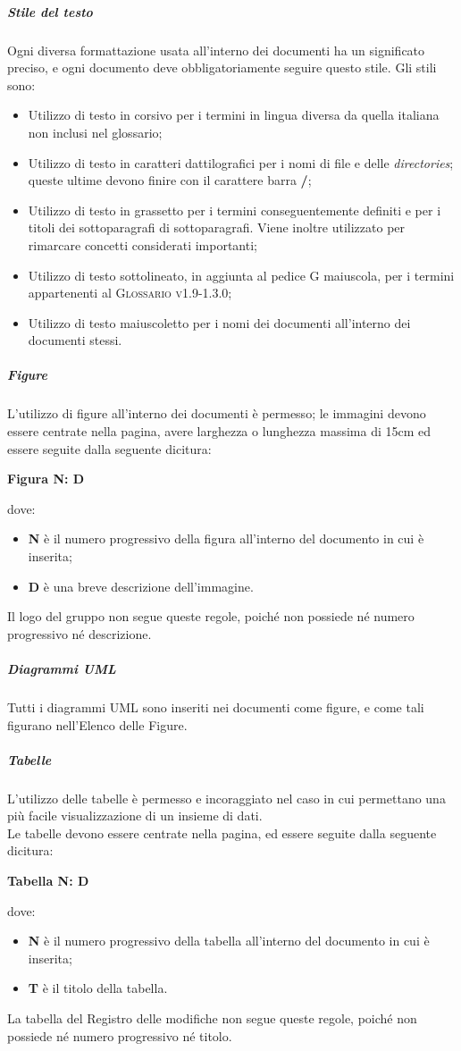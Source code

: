 \documentclass[../norme-di-progetto.tex]{subfiles}
\begin{document}
\subparagraph*{Stile del testo}
Ogni diversa formattazione usata all'interno dei documenti ha un significato preciso, e ogni documento deve obbligatoriamente seguire questo stile. Gli stili sono:
\begin{itemize}
  \item Utilizzo di testo in corsivo per i termini in lingua diversa da quella italiana non inclusi nel glossario;
  \item Utilizzo di testo in caratteri dattilografici per i nomi di file e delle \textit{directories}; queste ultime devono finire con il carattere barra \textbf{/};
  \item Utilizzo di testo in grassetto per i termini conseguentemente definiti e per i titoli dei sottoparagrafi di sottoparagrafi. Viene inoltre utilizzato per rimarcare concetti considerati importanti;
  \item Utilizzo di testo sottolineato, in aggiunta al pedice G maiuscola, per i termini appartenenti al \textsc{Glossario v1.9-1.3.0};
  \item Utilizzo di testo maiuscoletto per i nomi dei documenti all'interno dei documenti stessi.
\end{itemize}

\subparagraph*{Figure}
L'utilizzo di figure all'interno dei documenti è permesso; le immagini devono essere centrate nella pagina, avere larghezza o lunghezza massima di 15cm ed essere seguite dalla seguente dicitura: \\ \begin{center}
  \centering
  \textbf{Figura N: D}
\end{center} dove:
\begin{itemize}
  \item \textbf{N} è il numero progressivo della figura all'interno del documento in cui è inserita;
  \item \textbf{D} è una breve descrizione dell'immagine.
\end{itemize}
Il logo del gruppo non segue queste regole, poiché non possiede né numero progressivo né descrizione.

\subparagraph*{Diagrammi UML}
Tutti i diagrammi UML sono inseriti nei documenti come figure, e come tali figurano nell'Elenco delle Figure.

\subparagraph*{Tabelle}
L'utilizzo delle tabelle è permesso e incoraggiato nel caso in cui permettano una più facile visualizzazione di un insieme di dati. \\
Le tabelle devono essere centrate nella pagina, ed essere seguite dalla seguente dicitura: \\ \begin{center}
  \centering
  \textbf{Tabella N: D}
\end{center} dove:
\begin{itemize}
  \item \textbf{N} è il numero progressivo della tabella all'interno del documento in cui è inserita;
  \item \textbf{T} è il titolo della tabella.
\end{itemize}
La tabella del Registro delle modifiche non segue queste regole, poiché non possiede né numero progressivo né titolo.
\end{document}
